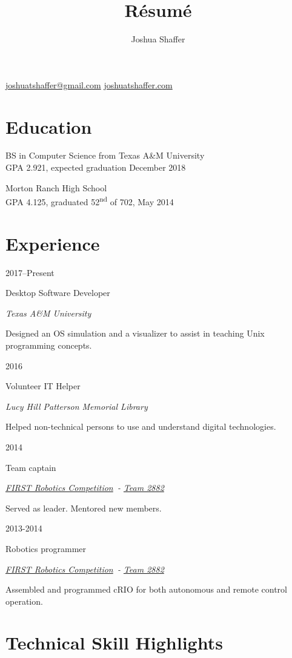 \documentclass{article}
\title{R\'esum\'e}
\author{Joshua Shaffer}
\newcommand{\jskill}[2]{
\noindent
\begin{minipage}[t]{.15\textwidth}
\hfill #1
\end{minipage}
\hspace{.05em}\vline\hspace{.05em}
\begin{minipage}[t]{.80\textwidth}
#2
\end{minipage}

\vspace{0.75em}}
\newcommand{\entry}[4]{
\jskill{#1}{#2

\textit{#3}

\footnotesize{#4}}
}
\newcommand{\frc}{\href{https://www.firstinspires.org/robotics/frc}{FIRST Robotics Competition}}
\newcommand{\frct}{\href{https://www.thebluealliance.com/team/2882}{Team 2882}}
\begin{document}
\begin{center}
 \begin{minipage}{2in}%
  \begin{center}
   \mbox{\huge\bfseries\theauthor}
   \mbox{\href{mailto:joshuatshaffer@gmail.com}{joshuatshaffer@gmail.com}}
   \mbox{\href{http://joshuatshaffer.com}{joshuatshaffer.com}}
  \end{center}
 \end{minipage}
 \hfill
\end{center}

\section{Education}

\begin{minipage}[t]{0.5\textwidth}
BS in Computer Science from Texas A\&M University \\
GPA 2.921, expected graduation December 2018
\end{minipage}
\begin{minipage}[t]{0.5\textwidth}
Morton Ranch High School \\
GPA 4.125, graduated 52\textsuperscript{nd} of 702, May 2014
\end{minipage}

\section{Experience}

\entry
{2017--Present}
{Desktop Software Developer}
{Texas A\&M University}
{Designed an OS simulation and a visualizer to assist in teaching Unix programming concepts.}

\entry
{2016}
{Volunteer IT Helper}
{Lucy Hill Patterson Memorial Library}
{Helped non-technical persons to use and understand digital technologies.}

\entry
{2014}
{Team captain}
{\frc\ - \frct}
{Served as leader. Mentored new members.}

\entry
{2013-2014}
{Robotics programmer}
{\frc\ - \frct}
{Assembled and programmed cRIO for both autonomous and remote control operation.}

\section{Technical Skill Highlights}
\end{document}
